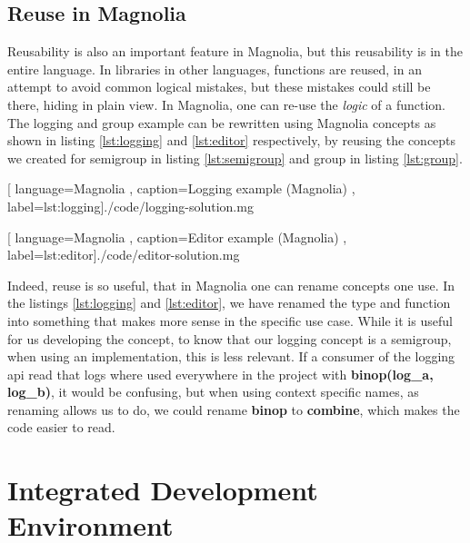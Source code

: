 \subsection{Reuse in Magnolia}

Reusability is also an important feature in Magnolia, but this reusability is in
the entire language. In libraries in other languages, functions are reused, in
an attempt to avoid common logical mistakes, but these mistakes could still be
there, hiding in plain view. In Magnolia, one can re-use the \textit{logic} of a
function. The logging and group example can be rewritten using Magnolia concepts
as shown in listing \ref{lst:logging} and \ref{lst:editor} respectively, by
reusing the concepts we created for semigroup in listing \ref{lst:semigroup} and group
in listing \ref{lst:group}.

\begin{center}
  
    [ language=Magnolia
    , caption={Logging example (Magnolia)}
    , label=lst:logging]{./code/logging-solution.mg}
\end{center}

\begin{center}
  
    [ language=Magnolia
    , caption={Editor example (Magnolia)}
    , label=lst:editor]{./code/editor-solution.mg}
\end{center}

Indeed, reuse is so useful, that in Magnolia one can rename concepts one use.
In the listings \ref{lst:logging} and \ref{lst:editor}, we have renamed the type
and function into something that makes more sense in the specific use case.
While it is useful for us developing the concept, to know that our logging
concept is a semigroup, when using an implementation, this is less relevant.
If a consumer of the logging \gls*{api} read that logs where used everywhere in
the project with \textbf{binop(log\_a, log\_b)}, it would be confusing, but when
using context specific names, as renaming allows us to do, we could rename
\textbf{binop} to \textbf{combine}, which makes the code easier to read.

\section{Integrated Development Environment} \label{sec:ide}

